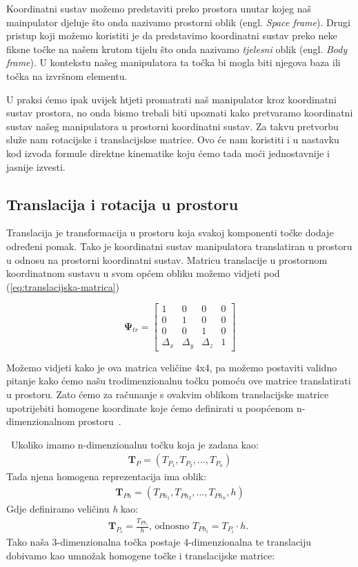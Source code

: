 \documentclass[times, utf8, diplomskirad]{fer}
\begin{document}
Koordinatni sustav možemo predstaviti preko prostora unutar kojeg naš mainpulator djeluje što onda nazivamo prostorni oblik (engl. \textit{Space frame}).
Drugi pristup koji možemo koristiti je da predstavimo koordinatni sustav preko neke fiksne točke na našem krutom tijelu što onda nazivamo \textit{tjelesni} oblik (engl. \textit{Body frame}).
U kontekstu našeg manipulatora ta točka bi mogla biti njegova baza ili točka na izvršnom elementu.

U praksi ćemo ipak uvijek htjeti promatrati naš manipulator kroz koordinatni sustav prostora, no onda bismo trebali biti upoznati kako pretvaramo koordinatni sustav našeg manipulatora u prostorni koordinatni sustav.
Za takvu pretvorbu služe nam rotacijske i translacijskse matrice.
Ovo će nam koristiti i u nastavku kod izvoda formule direktne kinematike koju ćemo tada moći jednostavnije i jasnije izvesti.

\subsection{Translacija i rotacija u prostoru}
Translacija je transformacija u prostoru koja svakoj komponenti točke dodaje određeni pomak.
Tako je koordinatni sustav manipulatora translatiran u prostoru u odnosu na prostorni koordinatni sustav.
Matricu translacije u prostornom koordinatnom sustavu u svom općem obliku možemo vidjeti pod (\ref{eq:translacijska-matrica})

\begin{equation}
\boldsymbol{\Psi}_{t r}=\left[
    \begin{array}{cccc}
        1 & 0 & 0 & 0 \\
        0 & 1 & 0 & 0 \\
        0 & 0 & 1 & 0 \\
        \Delta_x & \Delta_y & \Delta_z & 1
    \end{array}
    \right]
    \label{eq:translacijska-matrica}
\end{equation}

Možemo vidjeti kako je ova matrica veličine 4x4, pa možemo postaviti validno pitanje kako ćemo našu trodimenzionalnu točku pomoću ove matrice translatirati u prostoru.
Zato ćemo za računanje s ovakvim oblikom translacijske matrice upotrijebiti homogene koordinate koje ćemo definirati u poopćenom n-dimenzionalnom prostoru~\cite{book:irg}.

\noindent~Ukoliko imamo n-dimenzionalnu točku koja je zadana kao:
\begin{align*}
    \bm T_P=\left(T_{P_1}, T_{P_2}, \ldots, T_{P_n}\right)
\end{align*}
Tada njena homogena reprezentacija ima oblik:
\begin{align*}
    \bm T_{Ph}=\left(T_{Ph_1}, T_{Ph_2}, \ldots, T_{Ph_n}, h\right)
\end{align*}
Gdje definiramo veličinu \textit{h} kao:
\begin{align*}
    \bm T_{P_i}=\frac{T_{P h_i}}{h} \text {, odnosno } T_{P h_i}=T_{P_i} \cdot h \text {. }
\end{align*}
Tako naša 3-dimenzionalna točka postaje 4-dimenzionalna te translaciju dobivamo kao umnožak homogene točke i translacijske matrice:
\end{document}
